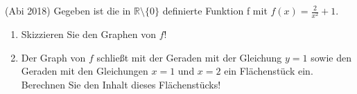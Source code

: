 \item (Abi 2018) Gegeben ist die in $\mathbb{R} \setminus \{0\}$ definierte Funktion f mit $f(x) = \frac{2}{x^2}+1$.

\begin{enumerate}
\item Skizzieren Sie den Graphen von $f$!
\item Der Graph von $f$ schließt mit der Geraden mit der Gleichung $y=1$ sowie den Geraden mit den Gleichungen $x=1$ und $x=2$ ein Flächenstück ein. Berechnen Sie den Inhalt dieses Flächenstücks!
\end{enumerate}

